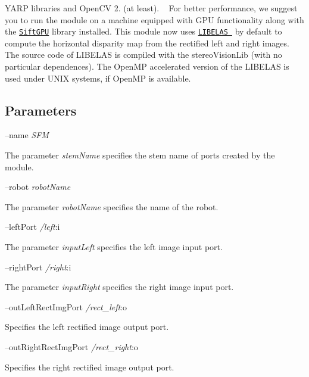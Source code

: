 Y\+A\+RP libraries and Open\+CV 2. (at least). ~\newline
For better performance, we suggest you to run the module on a machine equipped with G\+PU functionality along with the \href{http://cs.unc.edu/~ccwu/siftgpu}{\tt Sift\+G\+PU} library installed. This module now uses \href{http://www.cvlibs.net/software/libelas/}{\tt L\+I\+B\+E\+L\+AS } by default to compute the horizontal disparity map from the rectified left and right images. The source code of L\+I\+B\+E\+L\+AS is compiled with the stereo\+Vision\+Lib (with no particular dependences). The Open\+MP accelerated version of the L\+I\+B\+E\+L\+AS is used under U\+N\+IX systems, if Open\+MP is available.\hypertarget{group__SFM_parameters_sec}{}\subsection{Parameters}\label{group__SFM_parameters_sec}
--name {\itshape S\+FM} 
\begin{DoxyItemize}
\item The parameter {\itshape stem\+Name} specifies the stem name of ports created by the module.
\end{DoxyItemize}

--robot {\itshape robot\+Name} 
\begin{DoxyItemize}
\item The parameter {\itshape robot\+Name} specifies the name of the robot.
\end{DoxyItemize}

--left\+Port {\itshape /left}\+:i
\begin{DoxyItemize}
\item The parameter {\itshape input\+Left} specifies the left image input port.
\end{DoxyItemize}

--right\+Port {\itshape /right}\+:i
\begin{DoxyItemize}
\item The parameter {\itshape input\+Right} specifies the right image input port.
\end{DoxyItemize}

--out\+Left\+Rect\+Img\+Port {\itshape /rect\+\_\+left}\+:o
\begin{DoxyItemize}
\item Specifies the left rectified image output port.
\end{DoxyItemize}

--out\+Right\+Rect\+Img\+Port {\itshape /rect\+\_\+right}\+:o
\begin{DoxyItemize}
\item Specifies the right rectified image output port.
\end{DoxyItemize}

